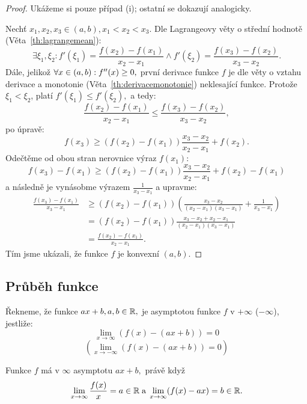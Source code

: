 \begin{proof}
    Ukážeme si pouze případ (i); ostatní se dokazují analogicky. 
    
    Nechť $x_1,x_2,x_3 \in (a,b), x_1 < x_2 < x_3.$ Dle Lagrangeovy věty
    o střední hodnotě (Věta~\ref{th:lagrangemean}):
    $$\exists \xi_1, \xi_2: f'(\xi_1) = \frac{f(x_2)-f(x_1)}{x_2-x_1} \land
    f'(\xi_2) = \frac{f(x_3)-f(x_2)}{x_3-x_2}.$$
    Dále, jelikož $\forall x \in (a,b): f''(x) \geq 0,$ první derivace funkce $f$ je
    dle věty o vztahu derivace a monotonie (Věta~\ref{th:derivacemonotonie})
    neklesající funkce. Protože $\xi_1 < \xi_2$, platí $f'(\xi_1) \leq f'(\xi_2),$
    a tedy:
    $$\frac{f(x_2)-f(x_1)}{x_2-x_1} \leq \frac{f(x_3)-f(x_2)}{x_3-x_2},$$
    po úpravě:
    $$f(x_3) \geq (f(x_2)-f(x_1))\frac{x_3-x_2}{x_2-x_1} + f(x_2).$$
    Odečtěme od obou stran nerovnice výraz $f(x_1):$
    $$f(x_3) -f(x_1) \geq (f(x_2)-f(x_1))\frac{x_3-x_2}{x_2-x_1} + f(x_2)-f(x_1)$$
    a následně je vynásobme výrazem $\frac{1}{x_3-x_1}$ a upravme:
    \begin{align*}
        \frac{f(x_3) -f(x_1)}{x_3 -x_1} 
        &\geq (f(x_2)-f(x_1)) \left(\frac{x_3-x_2}{(x_2-x_1)(x_3-x_1)} + \frac{1}{x_3-x_1}\right) \\
        &= (f(x_2)-f(x_1)) \frac{x_3-x_2+x_2-x_1}{(x_2-x_1)(x_3-x_1)} \\
        &= \frac{f(x_2)-f(x_1)}{x_2-x_1}.
    \end{align*}
    Tím jsme ukázali, že funkce $f$ je konvexní $(a,b).$
\end{proof}

\subsection{Průběh funkce}

\begin{definition}
    Řekneme, že funkce $ax + b, a,b \in \mathbb{R},$ je asymptotou funkce $f$ v $+\infty$ 
    ($-\infty$), jestliže:
    $$\lim_{x \to \infty} (f(x)-(ax+b)) = 0$$
    $$(\lim_{x \to -\infty} (f(x)-(ax+b)) = 0)$$
\end{definition}

\begin{theorem}
    Funkce $f$ má v $\infty$ asymptotu $ax+b,$ právě když
    $$\lim_{x\to\infty}\frac{f(x)}{x} = a\in\mathbb{R} \; \text {a} \; 
    \lim_{x\to\infty}(f(x) - ax) = b \in \mathbb{R}.$$
\end{theorem}

